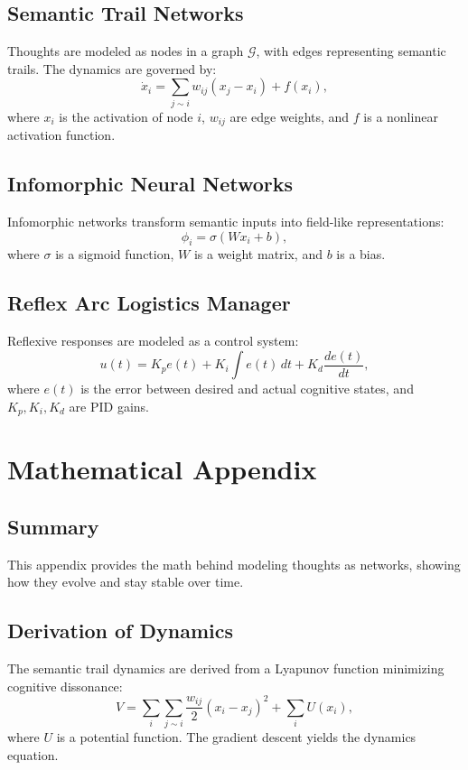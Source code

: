 \documentclass[11pt,oneside]{memoir}
\theoremstyle{plain}
\begin{document}
\subsection{Semantic Trail Networks}
Thoughts are modeled as nodes in a graph \(\mathcal{G}\), with edges representing semantic trails. The dynamics are governed by:
\begin{equation}
    \dot{x}_i = \sum_{j \sim i} w_{ij} (x_j - x_i) + f(x_i),
\end{equation}
where \(x_i\) is the activation of node \(i\), \(w_{ij}\) are edge weights, and \(f\) is a nonlinear activation function.

\subsection{Infomorphic Neural Networks}
Infomorphic networks transform semantic inputs into field-like representations:
\begin{equation}
    \phi_i = \sigma(W x_i + b),
\end{equation}
where \(\sigma\) is a sigmoid function, \(W\) is a weight matrix, and \(b\) is a bias.

\subsection{Reflex Arc Logistics Manager}
Reflexive responses are modeled as a control system:
\begin{equation}
    u(t) = K_p e(t) + K_i \int e(t) \, dt + K_d \frac{de(t)}{dt},
\end{equation}
where \(e(t)\) is the error between desired and actual cognitive states, and \(K_p, K_i, K_d\) are PID gains.

\section{Mathematical Appendix}
\subsection{Summary}
This appendix provides the math behind modeling thoughts as networks, showing how they evolve and stay stable over time.

\subsection{Derivation of Dynamics}
The semantic trail dynamics are derived from a Lyapunov function minimizing cognitive dissonance:
\begin{equation}
    V = \sum_i \sum_{j \sim i} \frac{w_{ij}}{2} (x_i - x_j)^2 + \sum_i U(x_i),
\end{equation}
where \(U\) is a potential function. The gradient descent yields the dynamics equation.
\end{document}
